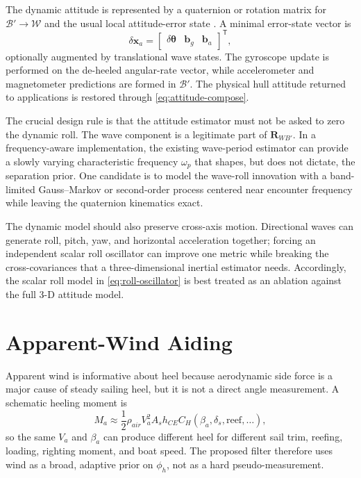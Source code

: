 \documentclass[conference]{IEEEtran}
\DeclareRobustCommand{\vct}[1]{\bm{#1}}
\DeclareRobustCommand{\mat}[1]{\bm{#1}}
\newcommand{\T}{^{\mathsf T}}
\begin{document}
The dynamic attitude is represented by a quaternion or rotation matrix for
$\mathcal B'\rightarrow\mathcal W$ and the usual local attitude-error state
\cite{Markley2003AttitudeError,Sola2017_QuaternionESKF}. A minimal error-state vector is
\begin{equation}
 \delta\vct x_a=
 \begin{bmatrix}
   \delta\vct\theta & \vct b_g & \vct b_a
 \end{bmatrix}\T,
 \label{eq:att-state}
\end{equation}
optionally augmented by translational wave states. The gyroscope update is performed on
the de-heeled angular-rate vector, while accelerometer and magnetometer predictions are
formed in $\mathcal B'$. The physical hull attitude returned to applications is restored
through \eqref{eq:attitude-compose}.

The crucial design rule is that the attitude estimator must not be asked to zero the
dynamic roll. The wave component is a legitimate part of $\mat R_{WB'}$. In a
frequency-aware implementation, the existing wave-period estimator can provide a slowly
varying characteristic frequency $\omega_p$ that shapes, but does not dictate, the
separation prior. One candidate is to model the wave-roll innovation with a band-limited
Gauss--Markov or second-order process centered near encounter frequency while leaving the
quaternion kinematics exact.

The dynamic model should also preserve cross-axis motion. Directional waves can generate
roll, pitch, yaw, and horizontal acceleration together; forcing an independent scalar
roll oscillator can improve one metric while breaking the cross-covariances that a
three-dimensional inertial estimator needs. Accordingly, the scalar roll model in
\eqref{eq:roll-oscillator} is best treated as an ablation against the full 3-D attitude
model.

\section{Apparent-Wind Aiding}
\label{sec:wind-aiding}

Apparent wind is informative about heel because aerodynamic side force is a major cause
of steady sailing heel, but it is not a direct angle measurement. A schematic heeling
moment is
\begin{equation}
 M_a \approx \frac12\rho_{air}V_a^2 A_s h_{CE}
 C_H(\beta_a,\delta_s,\mathrm{reef},\ldots),
 \label{eq:wind-moment}
\end{equation}
so the same $V_a$ and $\beta_a$ can produce different heel for different sail trim,
reefing, loading, righting moment, and boat speed. The proposed filter therefore uses
wind as a broad, adaptive prior on $\phi_h$, not as a hard pseudo-measurement.
\end{document}
